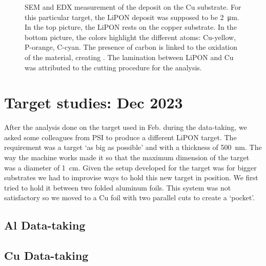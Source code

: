 \begin{refsection}
\begin{figure}
            \caption[SEM EDX LiPON analysis]{SEM and EDX measurement of the  deposit on the Cu substrate. For this particular target, the LiPON deposit was supposed to be \SI{2}{\micro m}. In the top picture, the LiPON rests on the copper substrate. In the bottom picture, the colors highlight the different atoms: Cu-yellow, P-orange, C-cyan. The presence of carbon is linked to the oxidation of the material, creating . The lamination between LiPON and Cu was attributed to the cutting procedure for the analysis.}
            \label{fig:X17:target:LiPON:psi}
        \end{figure}

\section{Target studies: Dec 2023}
    After the analysis done on the target used in Feb. during the data-taking, we asked some colleagues from PSI to produce a different LiPON target.
    The requirement was a target `as big as possible' and with a thickness of \SI{500}{\nano m}.
    The way the machine works made it so that the maximum dimension of the target was a diameter of \SI{1}{cm}.
    Given the setup developed for the target was for bigger substrates we had to improvise ways to hold this new target in position.
    We first tried to hold it between two folded aluminum foils. 
    This system was not satisfactory so we moved to a Cu foil with two parallel cuts to create a `pocket'.
    
    \subsection{Al Data-taking}
    \subsection{Cu Data-taking}
    

\end{refsection}
